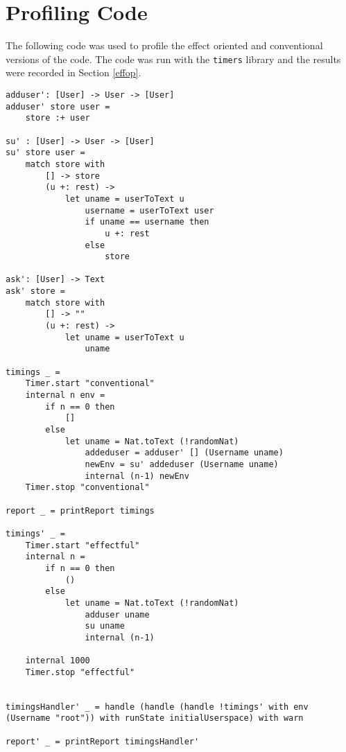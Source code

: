 \documentclass[logo,bsc,singlespacing,parskip]{infthesis}
\begin{document}
\chapter{Profiling Code}

The following code was used to profile the effect oriented and conventional
versions of the code. The code was run with the \texttt{timers} library
\cite{timers} and the results were recorded in Section \ref{effop}.

\begin{lstlisting}[language=unison]
adduser': [User] -> User -> [User]
adduser' store user = 
    store :+ user

su' : [User] -> User -> [User]
su' store user = 
    match store with
        [] -> store
        (u +: rest) -> 
            let uname = userToText u
                username = userToText user
                if uname == username then 
                    u +: rest 
                else 
                    store

ask': [User] -> Text
ask' store = 
    match store with 
        [] -> ""
        (u +: rest) -> 
            let uname = userToText u
                uname

timings _ = 
    Timer.start "conventional"
    internal n env = 
        if n == 0 then 
            []
        else 
            let uname = Nat.toText (!randomNat)
                addeduser = adduser' [] (Username uname)
                newEnv = su' addeduser (Username uname)
                internal (n-1) newEnv
    Timer.stop "conventional"

report _ = printReport timings

timings' _ = 
    Timer.start "effectful"
    internal n = 
        if n == 0 then 
            ()
        else 
            let uname = Nat.toText (!randomNat)
                adduser uname 
                su uname
                internal (n-1)

    internal 1000
    Timer.stop "effectful"
    

timingsHandler' _ = handle (handle (handle !timings' with env (Username "root")) with runState initialUserspace) with warn

report' _ = printReport timingsHandler'
\end{lstlisting}



\end{document}
